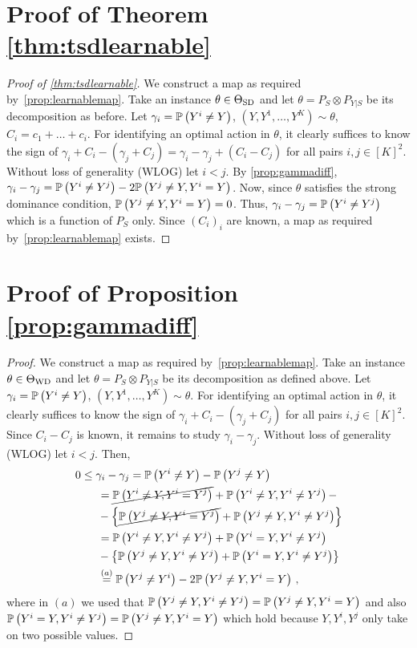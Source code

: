 \section*{Proof of  Theorem \ref{thm:tsdlearnable}}
\begin{proof}[Proof of \cref{thm:tsdlearnable}]
	We construct a map as required by~\cref{prop:learnablemap}.
	Take an instance $\theta \in \Theta_{\mathrm{SD}}$ and let $\theta = P_S \otimes P_{Y|S}$ be its decomposition as before.
	Let $\gamma_i = \mathbb{P}\left(Y^i \ne Y\right)$, $(Y,Y^1,\dots,Y^K)\sim \theta$, $C_i = c_1+\dots+c_i$.
	For identifying an optimal action in $\theta$, it clearly suffices
	to know the sign of $\gamma_i + C_i - (\gamma_j +C_j) = \gamma_i-\gamma_j + (C_i-C_j)$ for all pairs $i,j\in [K]^2$.
	Without loss of generality (WLOG) let $i<j$. By \cref{prop:gammadiff},
	$\gamma_i - \gamma_j = \mathbb{P}\left( Y^i \ne Y^j \right) -2 \mathbb{P}\left( Y^j\ne Y, Y^i = Y \right)$.
	Now, since $\theta$ satisfies the strong dominance condition, $ \mathbb{P}\left( Y^j\ne Y, Y^i = Y \right) = 0$.
	Thus, $\gamma_i - \gamma_j = \mathbb{P}\left( Y^i \ne Y^j \right)$
	which is a function of $P_S$ only.
	Since $(C_i)_i$ are known, a map as required by~\cref{prop:learnablemap} exists.
\end{proof}


\section*{Proof of Proposition \ref{prop:gammadiff}}

\begin{proof}
	
	We construct a map as required by~\cref{prop:learnablemap}.
	Take an instance $\theta \in \Theta_{\mathrm{WD}}$ and let $\theta = P_S \otimes P_{Y|S}$ be its decomposition
	as defined above.
	Let $\gamma_i = \mathbb{P}\left(Y^i \ne Y\right)$, $(Y,Y^1,\dots,Y^K)\sim \theta$.
	For identifying an optimal action in $\theta$, it clearly suffices
	to know the sign of $\gamma_i + C_i - (\gamma_j +C_j)$ for all pairs $i,j\in [K]^2$.
	Since $C_i - C_j$ is known, it remains to study $\gamma_i-\gamma_j$.
	Without loss of generality (WLOG) let $i<j$.
	Then, 
	\begin{align*}
	\MoveEqLeft 0  \le \gamma_i  - \gamma_j = \Prob{Y^i\ne Y} - \Prob{Y^j\ne Y} \\
	& = \cancel{\Prob{Y^i\ne Y, Y^i=Y^j}} + \Prob{ Y^i\ne Y, Y^i\ne Y^j } - \\
	& - \left\{ 
	\cancel{\Prob{Y^j\ne Y, Y^i=Y^j}} + \Prob{ Y^j\ne Y, Y^i\ne Y^j }\right\}\\
	& = \Prob{ Y^i\ne Y, Y^i \ne Y^j } + \Prob{Y^i=Y,Y^i\ne Y^j}       \\
	& - \left\{ 
	\Prob{ Y^j \ne Y, Y^i\ne Y^j } + \Prob{ Y^i=Y,Y^i\ne Y^j}
	\right\}\\
	& \stackrel{\footnotesize (a)}{=} \Prob{ Y^j \ne Y^i } -2 \Prob{ Y^j\ne Y, Y^i = Y }\,,
	\end{align*}
	where in $(a)$ we used that $\mathbb{P}\left( Y^j \ne Y, Y^i\ne Y^j \right) =  \mathbb{P}\left( Y^j\ne Y,Y^i= Y\right)$ and also
	$\mathbb{P}\left( Y^i=Y,Y^i\ne Y^j\right) = \mathbb{P}\left( Y^j\ne Y,Y^i= Y\right)$
	which hold because $Y,Y^i,Y^j$ only take on two possible values.
\end{proof}





